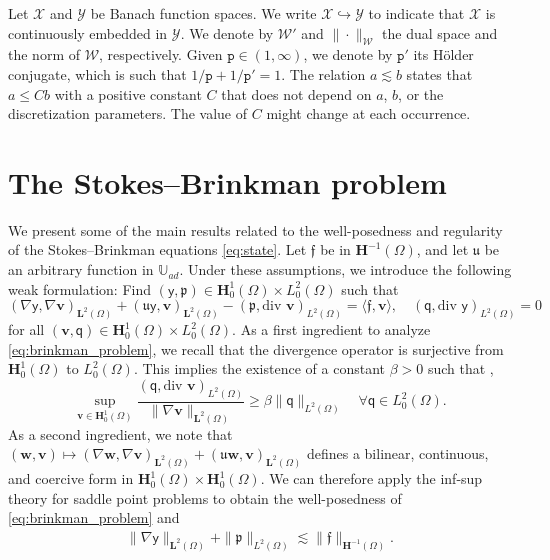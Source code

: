 \documentclass[final]{siamart0216}
\begin{document}
Let $\mathcal{X}$ and $\mathcal{Y}$ be Banach function spaces. We write $\mathcal{X} \hookrightarrow \mathcal{Y}$ to indicate that $\mathcal{X}$ is continuously embedded in $\mathcal{Y}$. We denote by $\mathcal{W}'$ and $\|\cdot\|_{\mathcal{W}}$ the dual space and the norm of $\mathcal{W}$, respectively. Given $\mathtt{p}\in(1, \infty)$, we denote by $\mathtt{p}\prime$ its H\"older conjugate, which is such that $1/\mathtt{p} + 1/\mathtt{p}\prime = 1$. The relation $a\lesssim b$ states that $a\leq Cb$ with a positive constant $C$ that does not depend on $a$, $b$, or the discretization parameters. The value of $C$ might change at each occurrence.

\section{The Stokes--Brinkman problem}
We present some of the main results related to the well-posedness and regularity of the Stokes--Brinkman equations \eqref{eq:state}. Let $\boldsymbol{\mathfrak{f}}$ be in $\mathbf{H}^{-1}(\Omega)$, and let $\mathfrak{u}$ be an arbitrary function in  $\mathbb{U}_{ad}$. Under these assumptions, we introduce the following weak formulation: Find $(\boldsymbol{\mathsf{y}},\mathfrak{p})\in \mathbf{H}_0^1(\Omega)\times L_0^2(\Omega)$ such that
\begin{equation}
\label{eq:brinkman_problem}
(\nabla \boldsymbol{\mathsf{y}},\nabla \mathbf{v})_{\mathbf{L}^2(\Omega)}
+
( \mathfrak{u}\boldsymbol{\mathsf{y}}, \mathbf{v})_{\mathbf{L}^2(\Omega)}
-
(\mathfrak{p},\text{div }\mathbf{v})_{L^2(\Omega)}
=
\langle \boldsymbol{\mathfrak{f}},\mathbf{v} \rangle,
\quad
(\mathsf{q},\text{div }\boldsymbol{\mathsf{y}})_{L^2(\Omega)}
=
0
\end{equation}
for all $(\mathbf{v},\mathsf{q}) \in \mathbf{H}_0^1(\Omega) \times L_0^2(\Omega)$. As a first ingredient to analyze \eqref{eq:brinkman_problem}, we recall that the divergence operator is surjective from $\mathbf{H}_0^1(\Omega)$ to $L_0^2(\Omega)$. This implies the existence of a constant $\beta>0$ such that \cite[Chapter I, Section 5.1]{MR851383}, \cite[Corollary B.71]{Guermond-Ern}
\begin{equation}\label{eq:infsup}
\sup_{\mathbf{v}\in \mathbf{H}_0^1(\Omega)}\dfrac{(\mathsf{q},\text{div }\mathbf{v})_{L^2(\Omega)}}{\|\nabla \mathbf{v}\|_{\mathbf{L}^2(\Omega)}}\geq \beta \|\mathsf{q}\|_{L^2(\Omega)}\quad\forall \mathsf{q}\in L_0^2(\Omega).
\end{equation}
As a second ingredient, we note that $(\mathbf{w},\mathbf{v}) \mapsto (\nabla \mathbf{w},\nabla \mathbf{v})_{\mathbf{L}^2(\Omega)}
+
( \mathfrak{u}\mathbf{w}, \mathbf{v})_{\mathbf{L}^2(\Omega)}$ defines a bilinear, continuous, and coercive form in $\mathbf{H}_0^1(\Omega) \times \mathbf{H}_0^1(\Omega)$. We can therefore apply the inf-sup theory for saddle point problems to obtain the well-posedness of \eqref{eq:brinkman_problem} and
\begin{align}\label{eq:well_posedness_brinkman}
	\|\nabla \boldsymbol{\mathsf{y}}\|_{\mathbf{L}^2(\Omega)}+\|\mathfrak{p}\|_{L^2(\Omega)}\lesssim \| \boldsymbol{\mathfrak{f}}\|_{\mathbf{H}^{-1}(\Omega)}.
\end{align}
\end{document}
